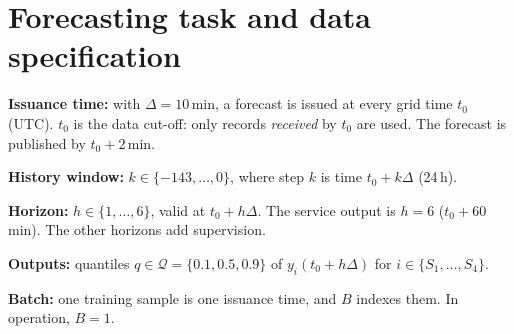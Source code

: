 \documentclass[11pt,a4paper]{article}
\begin{document}
\section{Forecasting task and data specification}\label{sec:task}
\textbf{Issuance time:} with $\Delta=10$\,min, a forecast is issued at every
grid time $t_0$ (UTC). $t_0$ is the data cut-off: only records \emph{received}
by $t_0$ are used. The forecast is published by $t_0+2$\,min.

\textbf{History window:} $k\in\{-143,\dots,0\}$, where step $k$ is time
$t_0+k\Delta$ (24\,h).

\textbf{Horizon:} $h\in\{1,\dots,6\}$, valid at $t_0+h\Delta$. The service
output is $h=6$ ($t_0+60$\,min). The other horizons add supervision.

\textbf{Outputs:} quantiles $q\in\mathcal{Q}=\{0.1,0.5,0.9\}$ of
$y_i(t_0+h\Delta)$ for $i\in\{S_1,\dots,S_4\}$.

\textbf{Batch:} one training sample is one issuance time, and $B$ indexes
them. In operation, $B=1$.
\end{document}

